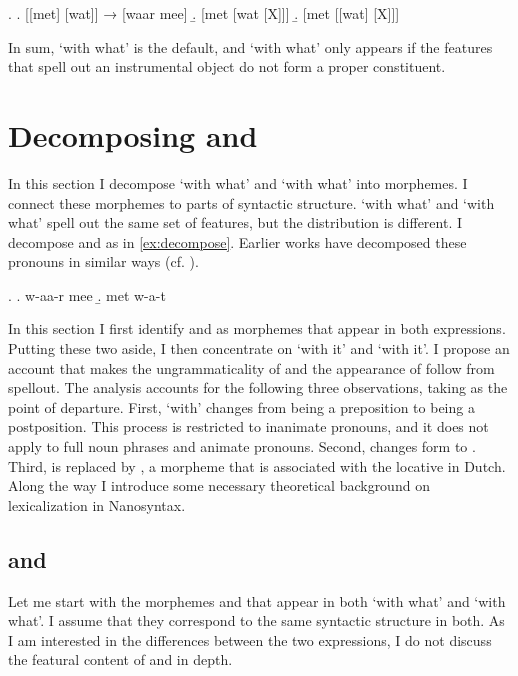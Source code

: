 \documentclass[11pt,a4paper]{article}
\begin{document}
\ex.\label{ex:summaryconst}
\a. [[met] [wat]] → [waar mee]\label{ex:waar meefr}
\b. [met [wat [X]]]\label{ex:metwatx}
\b. [met [[wat] [X]]]\label{ex:metwatfr}

In sum,  `with what' is the default, and  `with what' only appears if the features that spell out an instrumental object do not form a proper constituent.

\section{Decomposing  and }\label{sec:takingapart}

In this section I decompose  `with what' and  `with what' into morphemes. I connect these morphemes to parts of syntactic structure.  `with what' and  `with what' spell out the same set of features, but the distribution is different. I decompose  and  as in \ref{ex:decompose}. Earlier works have decomposed these pronouns in similar ways (cf. \citealt{hachem2015,noonan2017dutch,wesseling2018}).

\ex.\label{ex:decompose}
\a. w-aa-r mee
\b. met w-a-t

In this section I first identify  and  as morphemes that appear in both expressions. Putting these two aside, I then concentrate on  `with it' and  `with it'.
I propose an account that makes the ungrammaticality of  and the appearance of  follow from spellout. The analysis accounts for the following three observations, taking  as the point of departure. First,  `with' changes from being a preposition to being a postposition. This process is restricted to inanimate pronouns, and it does not apply to full noun phrases and animate pronouns. Second,  changes form to . Third,  is replaced by , a morpheme that is associated with the locative in Dutch.
Along the way I introduce some necessary theoretical background on lexicalization in Nanosyntax.

\subsection{ and }

Let me start with the morphemes  and  that appear in both  `with what' and  `with what'. I assume that they correspond to the same syntactic structure in both. As I am interested in the differences between the two expressions, I do not discuss the featural content of  and  in depth.
\end{document}
